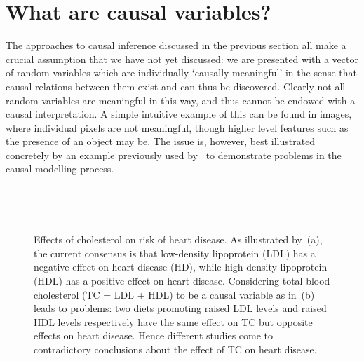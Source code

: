 \section{What are causal variables?}

The approaches to causal inference discussed in the previous section all make a crucial assumption that we have not yet discussed: we are presented with a vector of random variables which are individually `causally meaningful' in the sense that causal relations between them exist and can thus be discovered. 
Clearly not all random variables are meaningful in this way, and thus cannot be endowed with a causal interpretation.
A simple intuitive example of this can be found in images, where individual pixels are not meaningful, though higher level features such as the presence of an object may be.
The issue is, however, best illustrated concretely by an example previously used by~\cite{spirtes2004causal} to demonstrate problems in the causal modelling process.


\begin{figure}
	\begin{subfigure}{.45\linewidth}
		\center\
		\caption{}\label{fig:cholesterol:a}
	\end{subfigure}
	\hfill
	\begin{subfigure}{.45\linewidth}
		\center\
		\caption{}\label{fig:cholesterol:b}
	\end{subfigure}
	\caption{Effects of cholesterol on risk of heart disease. As illustrated by~(a), the current consensus is that low-density lipoprotein (LDL) has a negative effect on heart disease (HD), while high-density lipoprotein (HDL) has a positive effect on heart disease. Considering total blood cholesterol (TC = LDL + HDL) to be a causal variable as in~(b) leads to problems: two diets promoting raised LDL levels and raised HDL levels respectively have the same effect on TC but opposite effects on heart disease. Hence different studies come to contradictory conclusions about the effect of TC on heart disease.}
	\label{fig:cholesterol}
\end{figure}


